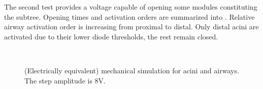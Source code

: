 
\clearpage
The second test provides a voltage capable of opening some modules
constituting the subtree.  Opening times and activation orders are
summarized into .  Relative
airway activation order is increasing from proximal to distal.  Only
distal acini are activated due to their lower diode thresholds, the
rest remain closed.

\begin{figure}[H]\centering
  \hspace{1cm}
  \\
  \hspace{1cm}
  \caption{(Electrically equivalent) mechanical simulation for acini
    and airways.  The step amplitude is 8V.}
  \label{fig:mechanical_results_8_2}
\end{figure}

